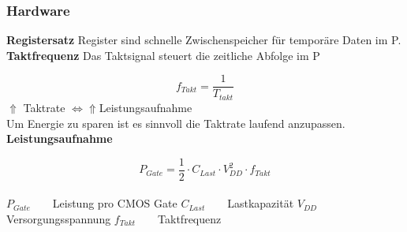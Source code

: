 \subsubsection{Hardware}
\textbf{Registersatz}\newline
Register sind schnelle Zwischenspeicher für temporäre Daten im \mu P.\\

\textbf{Taktfrequenz}\newline
Das Taktsignal steuert die zeitliche Abfolge im \mu P \newline

\[ f_{Takt}= \frac{1}{T_{takt}} \]
$ \Uparrow $ Taktrate $ \Leftrightarrow $$  \Uparrow  $Leistungsaufnahme \\
Um Energie zu sparen ist es sinnvoll die Taktrate laufend anzupassen.\\

\textbf{Leistungsaufnahme}
\begin{multicols}{2}
\[ P_{Gate}= \frac{1}{2} \cdot C_{Last} \cdot V_{DD}^2\cdot f_{Takt} \]\\
$ P_{Gate} \qquad$Leistung pro CMOS Gate \newline
$ C_{Last} \qquad $Lastkapazität\newline
$ V_{DD}\qquad $Versorgungsspannung\newline
$ f_{Takt} \qquad$Taktfrequenz
\end{multicols}

